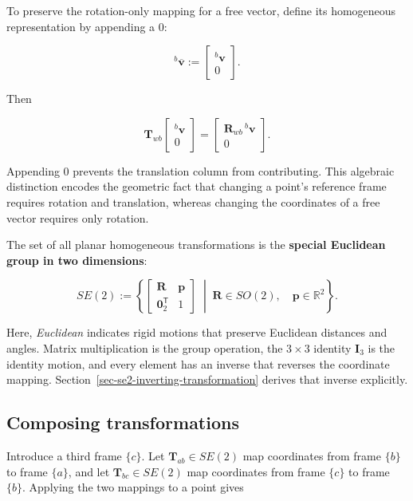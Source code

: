 \documentclass[
  australian,
  12pt,
  letterpaper,
  DIV=11,
  numbers=noendperiod,
  twoside]{scrreprt}
\begin{document}
To preserve the rotation-only mapping for a free vector, define its
homogeneous representation by appending a \(0\):

\[
{}^{b}\overline{\mathbf v}
\mathrel{:=}
\begin{bmatrix}
{}^{b}\mathbf v\\
0
\end{bmatrix}.
\]

Then

\[
\mathbf T_{wb}
\begin{bmatrix}
{}^{b}\mathbf v\\
0
\end{bmatrix}
=
\begin{bmatrix}
\mathbf R_{wb}\,{}^{b}\mathbf v\\
0
\end{bmatrix}.
\]

Appending \(0\) prevents the translation column from contributing. This
algebraic distinction encodes the geometric fact that changing a point's
reference frame requires rotation and translation, whereas changing the
coordinates of a free vector requires only rotation.

The set of all planar homogeneous transformations is the \textbf{special
Euclidean group in two dimensions}:

\[
SE(2)
\mathrel{:=}
\left\{
\begin{bmatrix}
\mathbf R&\mathbf p\\
\mathbf 0_2^\mathsf T&1
\end{bmatrix}
\;\middle|\;
\mathbf R\in SO(2),
\quad
\mathbf p\in\mathbb R^2
\right\}.
\]

Here, \emph{Euclidean} indicates rigid motions that preserve Euclidean
distances and angles. Matrix multiplication is the group operation, the
\(3\times3\) identity \(\mathbf I_3\) is the identity motion, and every
element has an inverse that reverses the coordinate mapping.
Section~\ref{sec-se2-inverting-transformation} derives that inverse
explicitly.

\subsection{Composing transformations}\label{composing-transformations}

Introduce a third frame \(\{c\}\). Let \(\mathbf T_{ab}\in SE(2)\) map
coordinates from frame \(\{b\}\) to frame \(\{a\}\), and let
\(\mathbf T_{bc}\in SE(2)\) map coordinates from frame \(\{c\}\) to
frame \(\{b\}\). Applying the two mappings to a point gives
\end{document}
